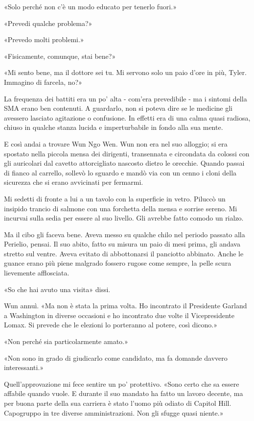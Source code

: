 «Solo perché non c'è un modo educato per tenerlo fuori.»

«Prevedi qualche problema?»

«Prevedo molti problemi.»

«Fisicamente, comunque, stai bene?»

«Mi sento bene, ma il dottore sei tu. Mi servono solo un paio d'ore in
più, Tyler. Immagino di farcela, no?»

La frequenza dei battiti era un po' alta - com'era prevedibile - ma i
sintomi della SMA erano ben contenuti. A guardarlo, non si poteva dire
se le medicine gli avessero lasciato agitazione o confusione. In effetti
era di una calma quasi radiosa, chiuso in qualche stanza lucida e
imperturbabile in fondo alla sua mente.

E così andai a trovare Wun Ngo Wen. Wun non era nel suo alloggio; si era
spostato nella piccola mensa dei dirigenti, transennata e circondata da
colossi con gli auricolari dal cavetto attorcigliato nascosto dietro le
orecchie. Quando passai di fianco al carrello, sollevò lo sguardo e
mandò via con un cenno i cloni della sicurezza che si erano avvicinati
per fermarmi.

Mi sedetti di fronte a lui a un tavolo con la superficie in vetro.
Piluccò un insipido trancio di salmone con una forchetta della mensa e
sorrise sereno. Mi incurvai sulla sedia per essere al suo livello. Gli
avrebbe fatto comodo un rialzo.

Ma il cibo gli faceva bene. Aveva messo su qualche chilo nel periodo
passato alla Perielio, pensai. Il suo abito, fatto su misura un paio di
mesi prima, gli andava stretto sul ventre. Aveva evitato di abbottonarsi
il panciotto abbinato. Anche le guance erano più piene malgrado fossero
rugose come sempre, la pelle scura lievemente afflosciata.

«So che hai avuto una visita» dissi.

Wun annuì. «Ma non è stata la prima volta. Ho incontrato il Presidente
Garland a Washington in diverse occasioni e ho incontrato due volte il
Vicepresidente Lomax. Si prevede che le elezioni lo porteranno al
potere, così dicono.»

«Non perché sia particolarmente amato.»

«Non sono in grado di giudicarlo come candidato, ma fa domande davvero
interessanti.»

Quell'approvazione mi fece sentire un po' protettivo. «Sono certo che sa
essere affabile quando vuole. E durante il suo mandato ha fatto un
lavoro decente, ma per buona parte della sua carriera è stato l'uomo più
odiato di Capitol Hill. Capogruppo in tre diverse amministrazioni. Non
gli sfugge quasi niente.»

